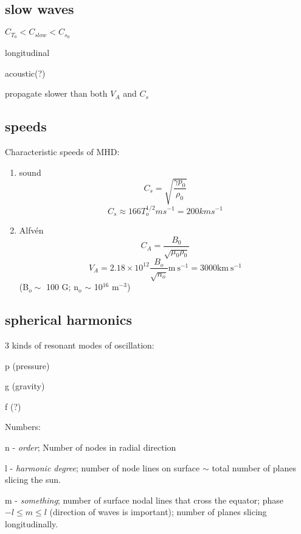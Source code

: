 \documentclass[12pt]{article}
\begin{document}
\subsection*{slow waves}
\begin{itemize*}
    \item $C_{T_0} < C_{slow} < C_{s_0}$
    \item longitudinal
    \item acoustic(?)
    \item propagate slower than both $V_A$ and $C_s$
\end{itemize*}

\subsection*{speeds}
Characteristic speeds of MHD:
\begin{enumerate}
    \item sound
        $$ C_s = \sqrt{\frac{\gamma p_0}{\rho_0}} $$
        $$ C_s \approx 166 T_o^{1/2} m s^{-1} = 200 km s^{-1}$$
    \item Alfv\'en
        $$ C_A = \frac{B_0}{\sqrt{\mu_0\rho_0}} $$
        $$ V_A = 2.18\times10^{12}\frac{B_o}{\sqrt{n_o}}
        \textrm{m}\ \textrm{s}^{-1}
               = 3000 \textrm{km}\ \textrm{s}^{-1} $$
               (B$_o \sim$ 100 G; n$_o$ $\sim$ 10$^{16}$ m$^{-3}$)
\end{enumerate}

\subsection*{spherical harmonics}
3 kinds of resonant modes of oscillation:
\begin{itemize*}
    \item p (pressure)
    \item g (gravity)
    \item f (?)
\end{itemize*}
Numbers:
\begin{itemize*}
    \item n - \emph{order}; Number of nodes in radial direction
    \item l - \emph{harmonic degree}; number of node lines on
        surface $\sim$ total number of planes slicing the sun.
    \item m - \emph{something}; number of surface nodal lines that
        cross the equator; phase\\
        $-l \leq m \leq l$ (direction of waves is important); number of
        planes slicing longitudinally.
\end{itemize*}
\end{document}
